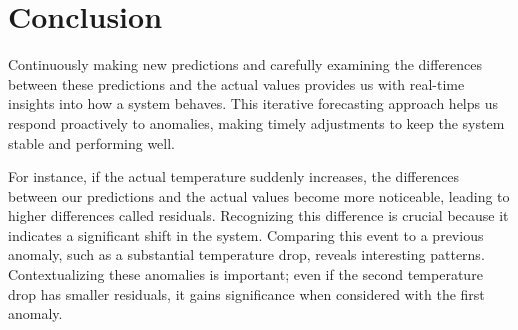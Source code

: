 \section{Conclusion}
\begin{comment}
By continuously generating new forecasts and scrutinizing the residuals, which represent the disparities between forecasted and actual values, provides valuable real-time insights into the system's dynamic behavior. This iterative forecasting approach enables a proactive response to anomalies, allowing for timely adjustments to maintain system stability and performance.

In a scenario where the actual temperature experiences an abrupt increase, deviations between the forecasts and actual values become pronounced, resulting in elevated residuals. It is essential to recognize that this deviation is a notable anomaly, indicative of a significant shift in the system. Comparing this to a prior anomaly, a substantial temperature drop, reveals interesting dynamics. The contextualization of anomalies is crucial; the second temperature drop, while less drastic in residuals, gains significance when considered in conjunction with the first anomaly.

Furthermore, the first anomaly, marked by a transient increase in residuals, emphasizes the system's adaptability to new input data. The swift decline in residuals following the initial anomaly showcases the forecasting system's responsiveness and its ability to quickly recalibrate to changing conditions. This responsiveness is a key characteristic, indicating that sustained spikes in residuals over extended periods would be atypical and may warrant closer investigation. In summary, the analysis of residuals not only aids in anomaly detection but also provides insights into the system's adaptability and responsiveness to evolving conditions.
\end{comment}
Continuously making new predictions and carefully examining the differences between these predictions and the actual values provides us with real-time insights into how a system behaves. This iterative forecasting approach helps us respond proactively to anomalies, making timely adjustments to keep the system stable and performing well.

For instance, if the actual temperature suddenly increases, the differences between our predictions and the actual values become more noticeable, leading to higher differences called residuals. Recognizing this difference is crucial because it indicates a significant shift in the system. Comparing this event to a previous anomaly, such as a substantial temperature drop, reveals interesting patterns. Contextualizing these anomalies is important; even if the second temperature drop has smaller residuals, it gains significance when considered with the first anomaly.

